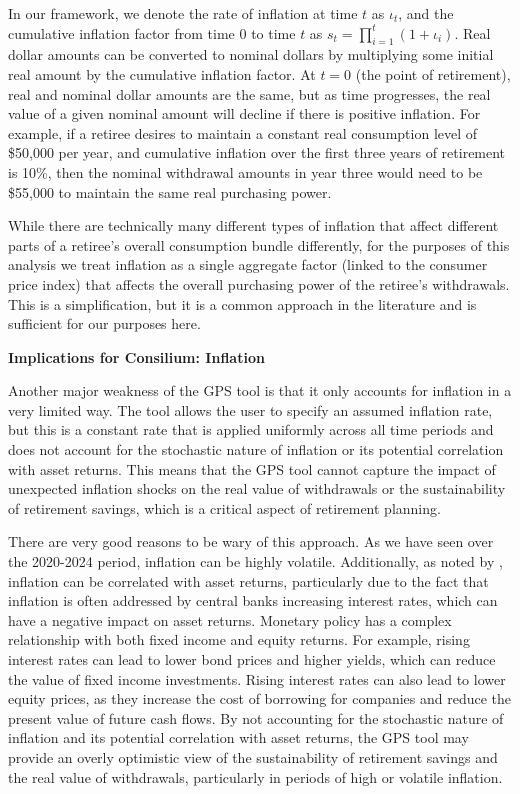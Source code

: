 \documentclass[11pt]{article}
\newcommand{\asideboxtitle}[1]{\noindent\textbf{\large #1}\par\vspace{0.5em}}
\begin{document}
In our framework, we denote the rate of inflation at time \(t\) as \(\iota_t\), and the cumulative inflation factor from time 0 to time \(t\) as \(s_t = \prod_{i=1}^{t} (1 + \iota_i)\). Real dollar amounts can be converted to nominal dollars by multiplying some initial real amount by the cumulative inflation factor. At \(t=0\) (the point of retirement), real and nominal dollar amounts are the same, but as time progresses, the real value of a given nominal amount will decline if there is positive inflation. For example, if a retiree desires to maintain a constant real consumption level of \$50,000 per year, and cumulative inflation over the first three years of retirement is 10\%, then the nominal withdrawal amounts in year three would need to be \$55,000 to maintain the same real purchasing power. 

While there are technically many different types of inflation that affect different parts of a retiree's overall consumption bundle differently, for the purposes of this analysis we treat inflation as a single aggregate factor (linked to the consumer price index) that affects the overall purchasing power of the retiree's withdrawals. This is a simplification, but it is a common approach in the literature and is sufficient for our purposes here.

\begin{asidebox}
\asideboxtitle{Implications for Consilium: Inflation}

Another major weakness of the GPS tool is that it only accounts for inflation in a very limited way. The tool allows the user to specify an assumed inflation rate, but this is a constant rate that is applied uniformly across all time periods and does not account for the stochastic nature of inflation or its potential correlation with asset returns. This means that the GPS tool cannot capture the impact of unexpected inflation shocks on the real value of withdrawals or the sustainability of retirement savings, which is a critical aspect of retirement planning.

There are very good reasons to be wary of this approach. As we have seen over the 2020-2024 period, inflation can be highly volatile. Additionally, as noted by \textcite{anarkulova2025beyond}, inflation can be correlated with asset returns, particularly due to the fact that inflation is often addressed by central banks increasing interest rates, which can have a negative impact on asset returns. Monetary policy has a complex relationship with both fixed income and equity returns. For example, rising interest rates can lead to lower bond prices and higher yields, which can reduce the value of fixed income investments. Rising interest rates can also lead to lower equity prices, as they increase the cost of borrowing for companies and reduce the present value of future cash flows. By not accounting for the stochastic nature of inflation and its potential correlation with asset returns, the GPS tool may provide an overly optimistic view of the sustainability of retirement savings and the real value of withdrawals, particularly in periods of high or volatile inflation. 

\end{asidebox}
\end{document}
